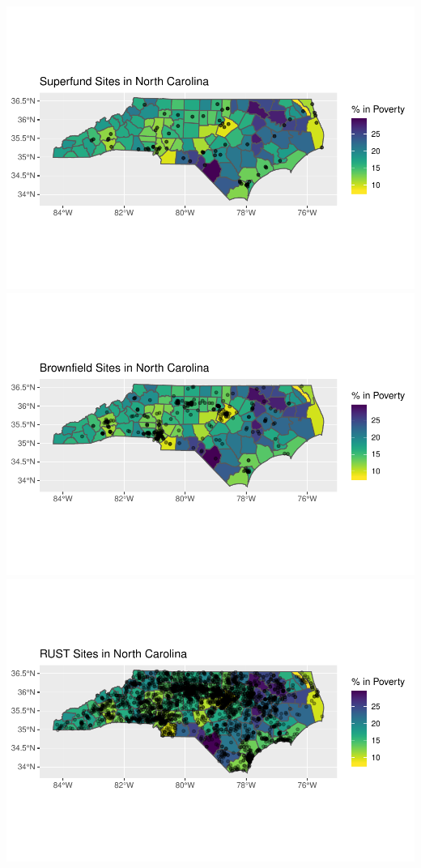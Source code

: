 \documentclass[12pt,]{article}
\begin{document}
\includegraphics{Townsend_Project_Template_files/figure-latex/final visualizations-9.pdf}
\includegraphics{Townsend_Project_Template_files/figure-latex/final visualizations-10.pdf}
\includegraphics{Townsend_Project_Template_files/figure-latex/final visualizations-11.pdf}
\end{document}
